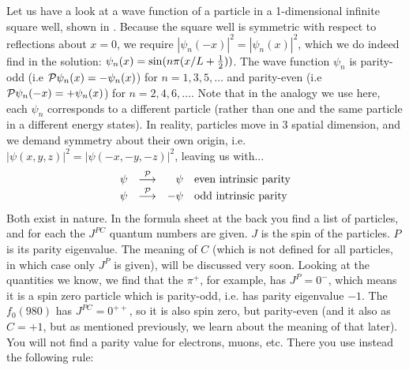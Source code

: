 Let us have a look at a wave function of a particle in a 1-dimensional infinite square well, shown in . Because the square well is symmetric with respect to reflections about $x=0$, we require $|\psi_n(-x)|^2=|\psi_n(x)|^2$, which we do indeed find in the solution: $\psi_n(x)=\sin(n \pi (x/L + \frac{1}{2}))$. The wave function $\psi_n$ is parity-odd (i.e $\mathcal{P} \psi_n(x) = -\psi_n(x)$) for $n = 1, 3, 5 , \ldots$ and parity-even (i.e $\mathcal{P} \psi_n(-x) = +\psi_n(x)$) for $n = 2, 4, 6, \ldots$. Note that in the analogy we use here, each $\psi_n$ corresponds to a different particle (rather than one and the same particle in a different energy states). In reality, particles move in 3 spatial dimension, and we demand symmetry about their own origin, i.e. $|\psi(x,y,z)|^2 = |\psi(-x,-y,-z)|^2$, leaving us with...\\
\begin{equation}
\begin{array}{rcrl}
 \psi& \stackrel{\mathcal{P}}{\longrightarrow} & \psi & \mbox{even intrinsic parity}
\\
 \psi& \stackrel{\mathcal{P}}{\longrightarrow} & -\psi & \mbox{odd intrinsic parity}
\end{array}
\end{equation}
 Both exist in nature. In the formula sheet at the back you find a list of particles, and for each the $J^{PC}$ quantum numbers are given. 
 $J$ is the spin of the particles. $P$ is its parity eigenvalue. The meaning of $C$ (which is not defined for all particles, in which case only $J^P$ is given), will be discussed very soon. 
 Looking at the quantities we know, we find that the $\pi^+$, for example, has $J^{P} = 0^-$, which means it is a spin zero particle which is parity-odd, i.e. has parity eigenvalue $-1$. The $f_0(980)$ has $J^{PC}=0^{++}$, so it is also spin zero, but parity-even (and it also as $C=+1$, but as mentioned previously, we learn about the meaning of that later). 
 You will not find a parity value for electrons, muons, etc. There you use instead the following rule:

